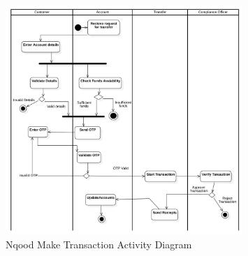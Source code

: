 \documentclass[a4paper]{report}
\begin{document}
\begin{figure}[h!]
    \centering
    \includegraphics[width=0.8\textwidth]{images/nqood-make-tx-activity-diagram.png}
    \caption{Nqood Make Transaction Activity Diagram}
    \label{fig:nqood-make-transaction-activity-diagram}
\end{figure}
\end{document}
